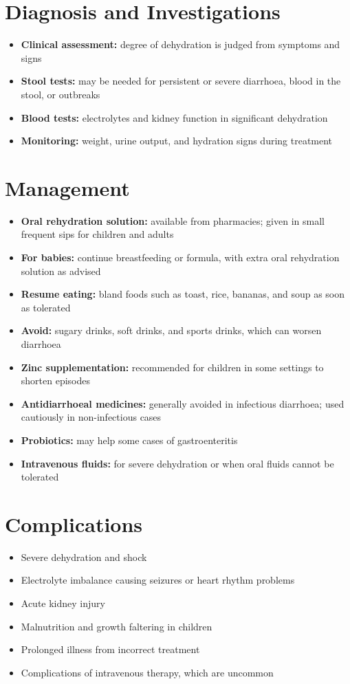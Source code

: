 \section*{Diagnosis and Investigations}
\begin{itemize}
    \item \textbf{Clinical assessment:} degree of dehydration is judged from symptoms and signs
    \item \textbf{Stool tests:} may be needed for persistent or severe diarrhoea, blood in the stool, or outbreaks
    \item \textbf{Blood tests:} electrolytes and kidney function in significant dehydration
    \item \textbf{Monitoring:} weight, urine output, and hydration signs during treatment
\end{itemize}

\section*{Management}
\begin{itemize}
    \item \textbf{Oral rehydration solution:} available from pharmacies; given in small frequent sips for children and adults
    \item \textbf{For babies:} continue breastfeeding or formula, with extra oral rehydration solution as advised
    \item \textbf{Resume eating:} bland foods such as toast, rice, bananas, and soup as soon as tolerated
    \item \textbf{Avoid:} sugary drinks, soft drinks, and sports drinks, which can worsen diarrhoea
    \item \textbf{Zinc supplementation:} recommended for children in some settings to shorten episodes
    \item \textbf{Antidiarrhoeal medicines:} generally avoided in infectious diarrhoea; used cautiously in non-infectious cases
    \item \textbf{Probiotics:} may help some cases of gastroenteritis
    \item \textbf{Intravenous fluids:} for severe dehydration or when oral fluids cannot be tolerated
\end{itemize}

\section*{Complications}
\begin{itemize}
    \item Severe dehydration and shock
    \item Electrolyte imbalance causing seizures or heart rhythm problems
    \item Acute kidney injury
    \item Malnutrition and growth faltering in children
    \item Prolonged illness from incorrect treatment
    \item Complications of intravenous therapy, which are uncommon
\end{itemize}

